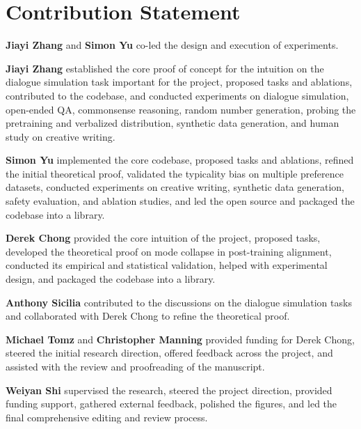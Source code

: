\section{Contribution Statement}
\label{sec:contribution statement}
\textbf{Jiayi Zhang} and \textbf{Simon Yu} co-led the design and execution of experiments. 

\textbf{Jiayi Zhang} established the core proof of concept for the intuition on the dialogue simulation task important for the project, proposed tasks and ablations, contributed to the codebase, and conducted experiments on dialogue simulation, open-ended QA, commonsense reasoning, random number generation, probing the pretraining and verbalized distribution, synthetic data generation, and human study on creative writing.



\textbf{Simon Yu} implemented the core codebase, proposed tasks and ablations, refined the initial theoretical proof, validated the typicality bias on multiple preference datasets, conducted experiments on creative writing, synthetic data generation, safety evaluation, and ablation studies, and led the open source and packaged the codebase into a library.


\textbf{Derek Chong} provided the core intuition of the project, proposed tasks, developed the theoretical proof on mode collapse in post-training alignment, conducted its empirical and statistical validation, helped with experimental design, and packaged the codebase into a library.

\textbf{Anthony Sicilia} contributed to the discussions on the dialogue simulation tasks and collaborated with Derek Chong to refine the theoretical proof.

\textbf{Michael Tomz} and \textbf{Christopher Manning} provided funding for Derek Chong, steered the initial research direction, offered feedback across the project, and assisted with the review and proofreading of the manuscript.

\textbf{Weiyan Shi} supervised the research, steered the project direction, provided funding support, gathered external feedback, polished the figures, and led the final comprehensive editing and review process.

